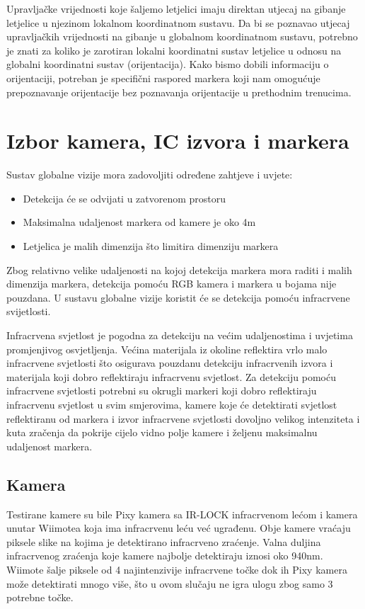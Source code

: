 \documentclass[times, utf8, diplomski]{fer}
\begin{document}
Upravljačke vrijednosti koje šaljemo letjelici imaju direktan utjecaj na gibanje letjelice u njezinom lokalnom koordinatnom sustavu. Da bi se poznavao utjecaj upravljačkih vrijednosti na gibanje u globalnom koordinatnom sustavu, potrebno je znati za koliko je zarotiran lokalni koordinatni sustav letjelice u odnosu na globalni koordinatni sustav (orijentacija). Kako bismo dobili informaciju o orijentaciji, potreban je specifični raspored markera koji nam omogućuje prepoznavanje orijentacije bez poznavanja orijentacije u prethodnim trenucima.

\section{Izbor kamera, IC izvora i markera}
Sustav globalne vizije mora zadovoljiti određene zahtjeve i uvjete:
\begin{itemize}
	\item Detekcija će se odvijati u zatvorenom prostoru
	\item Maksimalna udaljenost markera od kamere je oko 4m
	\item Letjelica je malih dimenzija što limitira dimenziju markera 
\end{itemize}
Zbog relativno velike udaljenosti na kojoj detekcija markera mora raditi i malih dimenzija markera, detekcija pomoću RGB kamera i markera u bojama nije pouzdana. U sustavu globalne vizije koristit će se detekcija pomoću infracrvene svijetlosti.

Infracrvena svjetlost je pogodna za detekciju na većim udaljenostima i uvjetima promjenjivog osvjetljenja. Većina materijala iz okoline reflektira vrlo malo infracrvene svjetlosti što osigurava pouzdanu detekciju infracrvenih izvora i materijala koji dobro reflektiraju infracrvenu svjetlost. Za detekciju pomoću infracrvene svjetlosti potrebni su okrugli markeri koji dobro reflektiraju infracrvenu svjetlost u svim smjerovima, kamere koje će detektirati svjetlost reflektiranu od markera i izvor infracrvene svjetlosti dovoljno velikog intenziteta i kuta zračenja da pokrije cijelo vidno polje kamere i željenu maksimalnu udaljenost markera.

\subsection{Kamera}
Testirane kamere su bile Pixy kamera sa IR-LOCK infracrvenom lećom i kamera unutar Wiimotea koja ima infracrvenu leću već ugrađenu. Obje kamere vraćaju piksele slike na kojima je detektirano infracrveno zraćenje. Valna duljina infracrvenog zraćenja koje kamere najbolje detektiraju iznosi oko 940nm. Wiimote šalje piksele od 4 najintenzivije infracrvene točke dok ih Pixy kamera može detektirati mnogo više, što u ovom slučaju ne igra ulogu zbog samo 3 potrebne točke.
\end{document}
